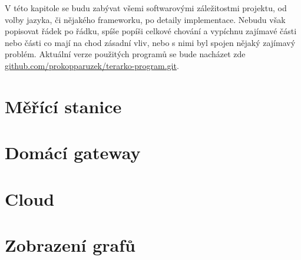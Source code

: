 V této kapitole se budu zabývat všemi softwarovými záležitostmi projektu, od volby jazyka, či nějakého frameworku, po 
detaily implementace. Nebudu však popisovat řádek po řádku, spíše popíši celkové chování a vypíchnu zajímavé části nebo 
části co mají na chod zásadní vliv, nebo s nimi byl spojen nějaký zajímavý problém. Aktuální verze použitých programů se 
bude nacházet zde 
\href{https://github.com/prokopparuzek/terarko-program.git}{github.com/prokopparuzek/terarko-program.git}.
\section{Měřící stanice}

\section{Domácí gateway}
\section{Cloud}
\section{Zobrazení grafů}
